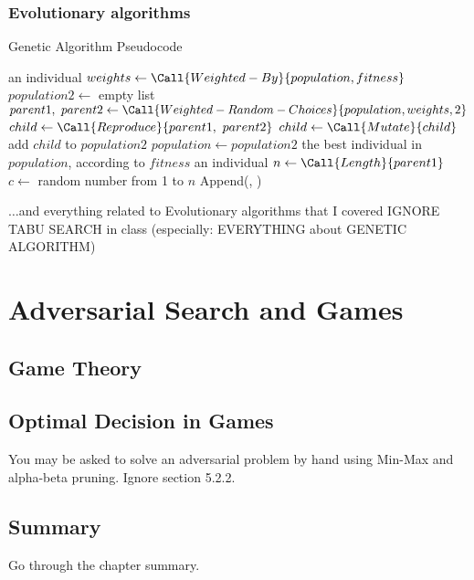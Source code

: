 \documentclass[exam={Midterm}]{cs581exam}
\begin{document}
\setcounter{subsection}{3}%
\subsubsection{Evolutionary algorithms}\label{subsubsec:4.1.4}
\begin{algorithm}[H]
	\caption{Genetic Algorithm Pseudocode}\label{alg:genetric-algorithm}
	\begin{algorithmic}[1]
		 \Returns an individual
		\Repeat
			\State $weights\gets\Call{Weighted-By}{population, fitness}$
			\State $population2\gets$ empty list
				\State $parent1,\ parent2\gets\Call{Weighted-Random-Choices}{population, weights, 2}$
				\State $child\gets\Call{Reproduce}{parent1,\ parent2}$
					$child\gets\Call{Mutate}{child}$
				\EndIf
				\State add $child$ to $population2$
			\EndFor
			\State $population\gets population2$
		\State \Return the best individual in $population$, according to $fitness$
		\EndFunction
		 \Returns an individual
			\State $n\gets\Call{Length}{parent1}$
			\State $c\gets$ random number from 1 to $n$
			\State \Return Append(, )
		\EndFunction
	\end{algorithmic}
\end{algorithm}
$\dots$and everything related to Evolutionary algorithms that I covered
IGNORE TABU SEARCH
in class (especially: EVERYTHING about GENETIC ALGORITHM)


\section{Adversarial Search and Games}\label{sec:adversarial-search-and-games}
\subsection{Game Theory}\label{subsec:5.1}
\subsection{Optimal Decision in Games}\label{subsec:5.2}
You may be asked to solve an adversarial problem by hand using Min-Max
and alpha-beta pruning. Ignore section 5.2.2.
\subsection{Summary}\label{subsec:5-summary}
Go through the chapter summary.
\end{document}
